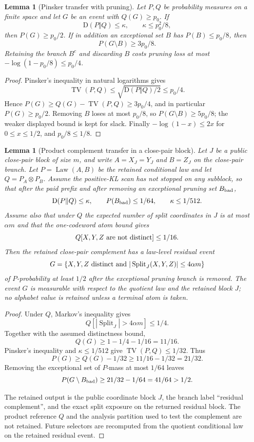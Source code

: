\documentclass[11pt]{article}
\newtheorem{lemma}[theorem]{Lemma}
\theoremstyle{remark}
\newcommand{\KL}{\mathrm D}
\newcommand{\Split}{\operatorname{Split}}
\newcommand{\Law}{\operatorname{Law}}
\newcommand{\TV}{\operatorname{TV}}
\begin{document}
\begin{lemma}[Pinsker transfer with pruning]\label{lem:appendix-pinsker-transfer}
Let $P,Q$ be probability measures on a finite space and let $G$ be an event with $Q(G)\ge p_0$.  If
\[
        \KL(P\Vert Q)\le \kappa,
        \qquad \kappa\le p_0^2/8,
\]
then $P(G)\ge p_0/2$.  If in addition an exceptional set $B$ has $P(B)\le p_0/8$, then
\[
        P(G\setminus B)\ge 3p_0/8.
\]
Retaining the branch $B^c$ and discarding $B$ costs pruning loss at most $-\log(1-p_0/8)\le p_0/4$.
\end{lemma}

\begin{proof}
Pinsker's inequality in natural logarithms gives
\[
        \TV(P,Q)\le \sqrt{\KL(P\Vert Q)/2}\le p_0/4.
\]
Hence $P(G)\ge Q(G)-\TV(P,Q)\ge 3p_0/4$, and in particular $P(G)\ge p_0/2$.  Removing $B$ loses at most $p_0/8$, so $P(G\setminus B)\ge 5p_0/8$; the weaker displayed bound is kept for slack.  Finally $-\log(1-x)\le 2x$ for $0\le x\le 1/2$, and $p_0/8\le 1/8$.
\end{proof}

\begin{lemma}[Product complement transfer in a close-pair block]\label{lem:appendix-complement-transfer}
Let $J$ be a public close-pair block of size $m$, and write $A=X_J=Y_J$ and $B=Z_J$ on the close-pair branch.  Let $P=\Law(A,B)$ be the retained conditional law and let $Q=P_A\otimes P_B$.  Assume the positive-KL scan has not stopped on any subblock, so that after the paid prefix and after removing an exceptional pruning set $B_{\rm bad}$,
\[
        \KL(P\Vert Q)\le \kappa,
        \qquad P(B_{\rm bad})\le 1/64,
        \qquad \kappa\le 1/512.
\]
Assume also that under $Q$ the expected number of split coordinates in $J$ is at most $\alpha m$ and that the one-codeword atom bound gives
\[
        Q[X,Y,Z\hbox{ are not distinct}]\le 1/16.
\]
Then the retained close-pair complement has a law-level residual event
\[
        G=\{X,Y,Z\hbox{ distinct and } |\Split_J(X,Y,Z)|\le 4\alpha m\}
\]
of $P$-probability at least $1/2$ after the exceptional pruning branch is removed.  The event $G$ is measurable with respect to the quotient law and the retained block $J$; no alphabet value is retained unless a terminal atom is taken.
\end{lemma}

\begin{proof}
Under $Q$, Markov's inequality gives
\[
        Q[|\Split_J|>4\alpha m]\le 1/4.
\]
Together with the assumed distinctness bound,
\[
        Q(G)\ge 1-1/4-1/16=11/16.
\]
Pinsker's inequality and $\kappa\le 1/512$ give $\TV(P,Q)\le 1/32$.  Thus
\[
        P(G)\ge Q(G)-1/32\ge 11/16-1/32=21/32.
\]
Removing the exceptional set of $P$-mass at most $1/64$ leaves
\[
        P(G\setminus B_{\rm bad})\ge 21/32-1/64=41/64>1/2.
\]

The retained output is the public coordinate block $J$, the branch label ``residual complement'', and the exact split exposure on the returned residual block.  The product reference $Q$ and the analysis partition used to test the complement are not retained.  Future selectors are recomputed from the quotient conditional law on the retained residual event.
\end{proof}
\end{document}
